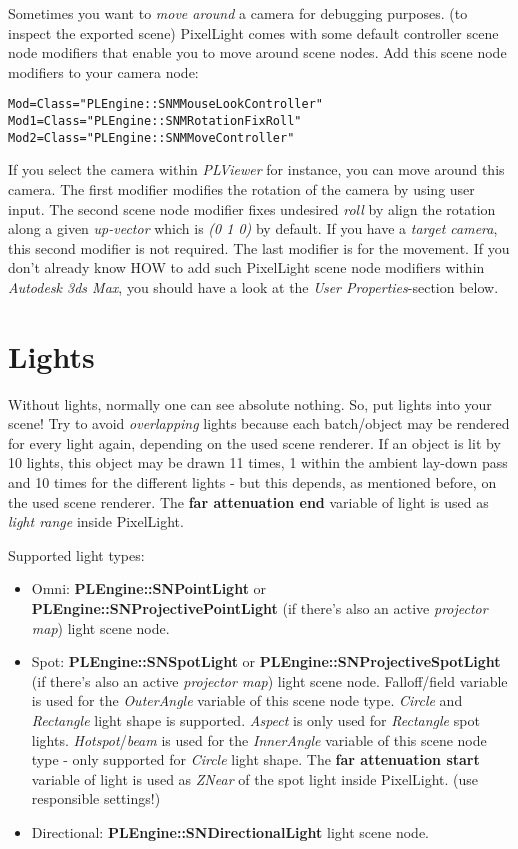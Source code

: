 Sometimes you want to \emph{move around} a camera for debugging purposes. (to inspect the exported scene) PixelLight comes with some default controller scene node modifiers that enable you to move around scene nodes. Add this scene node modifiers to your camera node:

\begin{lstlisting}[caption=Free camera scene node modifiers]
Mod=Class="PLEngine::SNMMouseLookController"
Mod1=Class="PLEngine::SNMRotationFixRoll"
Mod2=Class="PLEngine::SNMMoveController"
\end{lstlisting}

If you select the camera within \emph{PLViewer} for instance, you can move around this camera. The first modifier modifies the rotation of the camera by using user input. The second scene node modifier fixes undesired \emph{roll} by align the rotation along a given \emph{up-vector} which is \emph{(0 1 0)} by default. If you have a \emph{target camera}, this second modifier is not required. The last modifier is for the movement. If you don't already know HOW to add such PixelLight scene node modifiers within \emph{Autodesk 3ds Max}, you should have a look at the \emph{User Properties}-section below.




\section{Lights}
Without lights, normally one can see absolute nothing. So, put lights into your scene! Try to avoid \emph{overlapping} lights because each batch/object may be rendered for every light again, depending on the used scene renderer. If an object is lit by 10 lights, this object may be drawn 11 times, 1 within the ambient lay-down pass and 10 times for the different lights - but this depends, as mentioned before, on the used scene renderer. The \textbf{far attenuation end} variable of light is used as \emph{light range} inside PixelLight.

Supported light types:
\begin{itemize}
\item{Omni: \textbf{PLEngine::SNPointLight} or \textbf{PLEngine::SNProjectivePointLight} (if there's also an active \emph{projector map}) light scene node.}
\item{Spot: \textbf{PLEngine::SNSpotLight} or \textbf{PLEngine::SNProjectiveSpotLight} (if there's also an active \emph{projector map}) light scene node. Falloff/field variable is used for the \emph{OuterAngle} variable of this scene node type. \emph{Circle} and \emph{Rectangle} light shape is supported. \emph{Aspect} is only used for \emph{Rectangle} spot lights. \emph{Hotspot}/\emph{beam} is used for the \emph{InnerAngle} variable of this scene node type - only supported for \emph{Circle} light shape. The \textbf{far attenuation start} variable of light is used as \emph{ZNear} of the spot light inside PixelLight. (use responsible settings!)}
\item{Directional: \textbf{PLEngine::SNDirectionalLight} light scene node.}
\end{itemize}

